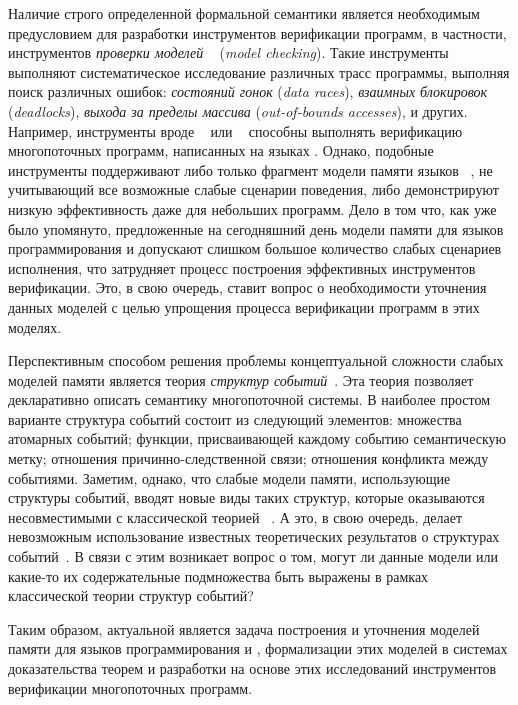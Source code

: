 Наличие строго определенной формальной семантики является необходимым
предусловием для разработки инструментов верификации программ,
в частности, инструментов \emph{проверки моделей}%
~\autocite{Baier:2008} (\emph{model checking}).
Такие инструменты выполняют систематическое исследование различных 
трасс программы, выполняя поиск различных ошибок:
\emph{состояний гонок} (\emph{data races}), 
\emph{взаимных блокировок} (\emph{deadlocks}),
\emph{выхода за пределы массива} (\emph{out-of-bounds accesses}), и других. 
Например, инструменты вроде \genmc~\autocite{Kokologiannakis:CAD2021} 
или \CDSChecker~\autocite{Norris-Demsky:OOPSLA2013} способны выполнять верификацию 
многопоточных программ, написанных на языках \CPP. 
Однако, подобные инструменты поддерживают либо только фрагмент 
модели памяти языков \CPP~\autocite{Lahav-al:PLDI17}, 
не учитывающий все возможные слабые сценарии поведения, 
либо демонстрируют низкую эффективность даже для небольших программ. 
Дело в том что, как уже было упомянуто, предложенные на сегодняшний день модели памяти для языков
программирования \CPP и \Java допускают слишком большое количество
слабых сценариев исполнения, что затрудняет процесс построения эффективных инструментов верификации.
Это, в свою очередь, ставит вопрос о необходимости уточнения данных моделей
с целью упрощения процесса верификации программ в этих моделях.

Перспективным способом решения  проблемы концептуальной сложности слабых моделей памяти является 
теория \emph{структур событий}~\autocite{Winskel:86}.
Эта теория позволяет декларативно описать семантику многопоточной системы.
В наиболее простом варианте  структура событий состоит из следующий элементов: 
множества атомарных событий;
функции, присваивающей каждому событию семантическую метку; 
отношения причинно-следственной связи;  отношения конфликта между событиями.
Заметим, однако, что  слабые модели памяти, использующие структуры событий, 
вводят новые виды таких структур, которые оказываются 
несовместимыми с классической теорией%
~\cite{Winskel:86,Nielsen-al:1981,Boudol-Castellani:1991,Langerak:91,Baldan-al:IC01}. 
А это, в свою очередь, делает невозможным использование известных теоретических результатов
о структурах событий~\autocite{Vaandrager:TCS1991,Sassone:MFCS1993,Nielsen:REX93,Winskel-TCS:09}.
В связи с этим возникает вопрос о том, могут ли данные модели
или какие-то их содержательные подмножества быть выражены
в рамках классической теории структур событий?

Таким образом, актуальной является задача построения и уточнения 
моделей памяти для языков программирования \CPP и \Java,
формализации этих моделей в системах доказательства теорем
и разработки на основе этих исследований инструментов верификации многопоточных программ.

